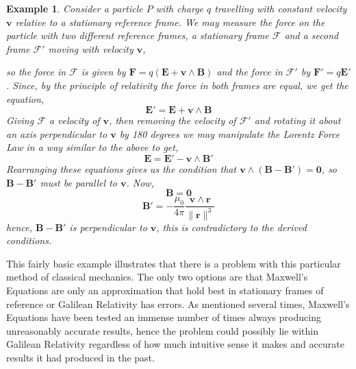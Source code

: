 \documentclass[a4paper,12pt,draft]{report}
\newtheorem{example}{Example}
\begin{document}
\begin{example}
Consider a particle $P$ with charge $q$ travelling with constant velocity $\mathbf{v}$ relative to a stationary reference frame. We may measure the force on the particle with two different reference frames, a stationary frame $\mathcal{F}$ and a second frame $\mathcal{F'}$ moving with velocity $\mathbf{v}$,\\
\begin{center}
\end{center}
so the force in $\mathcal{F}$ is given by $\mathbf{F} = q(\mathbf{E} + \mathbf{v} \wedge \mathbf{B})$ and the force in $\mathcal{F}'$ by $\mathbf{F'} = q\mathbf{E}'$. Since, by the principle of relativity the force in both frames are equal, we get the equation,
$$
\mathbf{E}' = \mathbf{E} + \mathbf{v} \wedge \mathbf{B}
$$
Giving $\mathcal{F}$ a velocity of $\mathbf{v}$, then removing the velocity of $\mathcal{F'}$ and rotating it about an axis perpendicular to $\mathbf{v}$ by 180 degrees we may manipulate the Lorentz Force Law in a way similar to the above to get,
$$
\mathbf{E} = \mathbf{E}' - \mathbf{v} \wedge \mathbf{B}'
$$
Rearranging these equations gives us the condition that $\mathbf{v} \wedge (\mathbf{B} - \mathbf{B}') = \mathbf{0}$, so $\mathbf{B} - \mathbf{B}'$ must be parallel to $\mathbf{v}$. Now,
$$
\mathbf{B} = \mathbf{0}
$$
$$
\mathbf{B}' = -\frac{\mu_0}{4\pi}\frac{\mathbf{v} \wedge \mathbf{r}}{\|\mathbf{r}\|^3}
$$
hence, $\mathbf{B} - \mathbf{B}'$ is perpendicular to $\mathbf{v}$, this is contradictory to the derived conditions.
\end{example}

This fairly basic example illustrates that there is a problem with this particular method of classical mechanics. The only two options are that Maxwell's Equations are only an approximation that hold best in stationary frames of reference or Galilean Relativity has errors. As mentioned several times, Maxwell's Equations have been tested an immense number of times always producing unreasonably accurate results, hence the problem could possibly lie within Galilean Relativity regardless of how much intuitive sense it makes and accurate results it had produced in the past.
\end{document}

